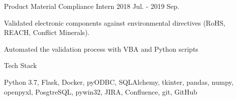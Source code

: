 \begin{cventries}
  \cventry
    {Product Material Compliance Intern} %
    {}
    {}
    {2018 Jul. - 2019 Sep.} %
    {
      \begin{cvitems} %
        \item {Validated electronic components against environmental directives (RoHS, REACH, Conflict Minerals).}
        \item {Automated the validation process with VBA and Python scripts}
      \end{cvitems}
    }

  \cventry
    {Tech Stack} %
    {}
    {}
    {}
    {
      \begin{cvitems}
        \item {Python 3.7, Flask, Docker, pyODBC, SQLAlchemy, tkinter, pandas, numpy, openpyxl, PosgtreSQL, pywin32, JIRA, Confluence, git, GitHub}
      \end{cvitems}
    }

\end{cventries}
